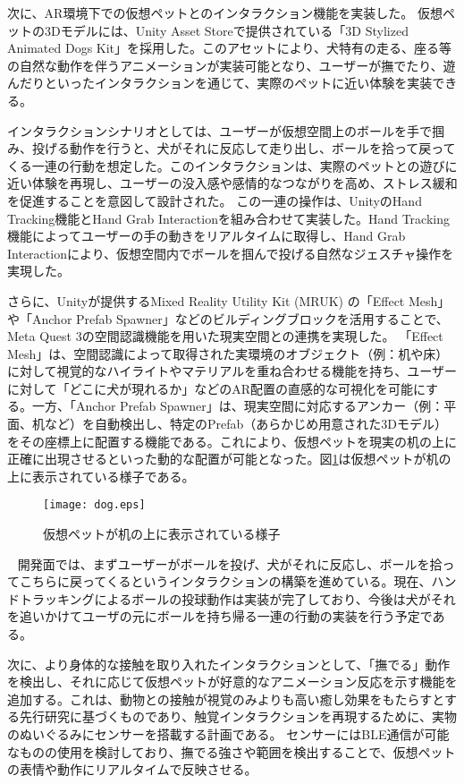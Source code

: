 \documentclass[a4j]{ltjsarticle}
\newcounter{seccnt}
\newcommand{\usection}[1]{\ \newline{\bf\underline{\theseccnt\stepcounter{seccnt}. #1}\hspace{10pt}}}
\begin{document}
次に、AR環境下での仮想ペットとのインタラクション機能を実装した。
仮想ペットの3Dモデルには、Unity Asset Storeで提供されている「3D Stylized Animated Dogs Kit」を採用した。このアセットにより、犬特有の走る、座る等の自然な動作を伴うアニメーションが実装可能となり、ユーザーが撫でたり、遊んだりといったインタラクションを通じて、実際のペットに近い体験を実装できる。

インタラクションシナリオとしては、ユーザーが仮想空間上のボールを手で掴み、投げる動作を行うと、犬がそれに反応して走り出し、ボールを拾って戻ってくる一連の行動を想定した。このインタラクションは、実際のペットとの遊びに近い体験を再現し、ユーザーの没入感や感情的なつながりを高め、ストレス緩和を促進することを意図して設計された。
この一連の操作は、UnityのHand Tracking機能とHand Grab Interactionを組み合わせて実装した。Hand Tracking機能によってユーザーの手の動きをリアルタイムに取得し、Hand Grab Interactionにより、仮想空間内でボールを掴んで投げる自然なジェスチャ操作を実現した。

さらに、Unityが提供するMixed Reality Utility Kit (MRUK) の「Effect Mesh」や「Anchor Prefab Spawner」などのビルディングブロックを活用することで、Meta Quest 3の空間認識機能を用いた現実空間との連携を実現した。
「Effect Mesh」は、空間認識によって取得された実環境のオブジェクト（例：机や床）に対して視覚的なハイライトやマテリアルを重ね合わせる機能を持ち、ユーザーに対して「どこに犬が現れるか」などのAR配置の直感的な可視化を可能にする。一方、「Anchor Prefab Spawner」は、現実空間に対応するアンカー（例：平面、机など）を自動検出し、特定のPrefab（あらかじめ用意された3Dモデル）をその座標上に配置する機能である。これにより、仮想ペットを現実の机の上に正確に出現させるといった動的な配置が可能となった。図\ref{fig:dog}は仮想ペットが机の上に表示されている様子である。

\begin{figure}[b]
  \centering
  \texttt{[image: dog.eps]}
  \caption{仮想ペットが机の上に表示されている様子}
  \label{fig:dog}
\end{figure}


\usection{今後の計画}
開発面では、まずユーザーがボールを投げ、犬がそれに反応し、ボールを拾ってこちらに戻ってくるというインタラクションの構築を進めている。現在、ハンドトラッキングによるボールの投球動作は実装が完了しており、今後は犬がそれを追いかけてユーザの元にボールを持ち帰る一連の行動の実装を行う予定である。

次に、より身体的な接触を取り入れたインタラクションとして、「撫でる」動作を検出し、それに応じて仮想ペットが好意的なアニメーション反応を示す機能を追加する。これは、動物との接触が視覚のみよりも高い癒し効果をもたらすとする先行研究\cite{3}に基づくものであり、触覚インタラクションを再現するために、実物のぬいぐるみにセンサーを搭載する計画である。
センサーにはBLE通信が可能なものの使用を検討しており、撫でる強さや範囲を検出することで、仮想ペットの表情や動作にリアルタイムで反映させる。
\end{document}
